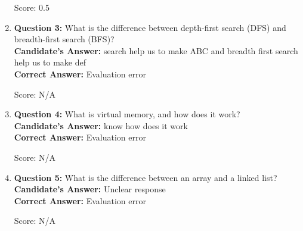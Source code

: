 \documentclass[a4paper,12pt]{article}
\begin{document}
\begin{enumerate}
\begin{minipage}{0.7\textwidth}
    \end{minipage}
    \hfill
    \begin{minipage}{0.28\textwidth}
        \begin{flushright}
            \small Score: 0.5
        \end{flushright}
    \end{minipage}
\item 
    \begin{minipage}{0.7\textwidth}
        \textbf{Question 3:} What is the difference between depth-first search (DFS) and breadth-first search (BFS)? \\
        \textbf{Candidate's Answer:} search help us to make ABC and breadth first search help us to make def \\
        \textbf{Correct Answer:} Evaluation error
    \end{minipage}
    \hfill
    \begin{minipage}{0.28\textwidth}
        \begin{flushright}
            \small Score: N/A
        \end{flushright}
    \end{minipage}
\item 
    \begin{minipage}{0.7\textwidth}
        \textbf{Question 4:} What is virtual memory, and how does it work? \\
        \textbf{Candidate's Answer:} know how does it work \\
        \textbf{Correct Answer:} Evaluation error
    \end{minipage}
    \hfill
    \begin{minipage}{0.28\textwidth}
        \begin{flushright}
            \small Score: N/A
        \end{flushright}
    \end{minipage}
\item 
    \begin{minipage}{0.7\textwidth}
        \textbf{Question 5:} What is the difference between an array and a linked list? \\
        \textbf{Candidate's Answer:} Unclear response \\
        \textbf{Correct Answer:} Evaluation error
    \end{minipage}
    \hfill
    \begin{minipage}{0.28\textwidth}
        \begin{flushright}
            \small Score: N/A
        \end{flushright}
    \end{minipage}
\end{enumerate}
\end{document}
